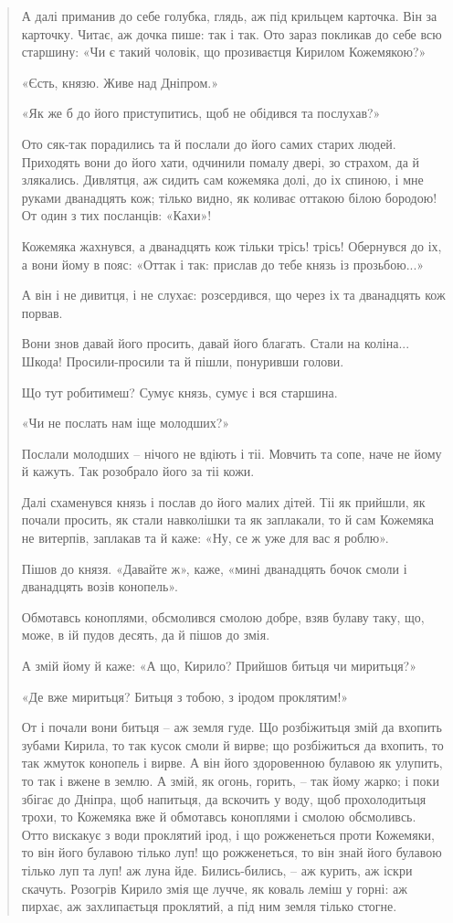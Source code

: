 \begin{quotation}
А далі приманив до себе голубка, глядь, аж під крильцем карточка. Він за карточку. Читає, аж дочка пише: так і так. Ото зараз покликав до себе всю старшину: «Чи є такий чоловік, що прозиваєтця Кирилом Кожемякою?»

«Єсть, князю. Живе над Дніпром.»

«Як же б до його приступитись, щоб не обідився та послухав?»

Ото сяк-так порадились та й послали до його самих старих людей. Приходять вони до його хати, одчинили помалу двері, зо страхом, да й злякались. Дивлятця, аж сидить сам кожемяка долі, до іх спиною, і мне руками дванадцять кож; тілько видно, як коливає оттакою білою бородою! От один з тих посланців: «Кахи»!

Кожемяка жахнувся, а дванадцять кож тільки трісь! трісь! Обернувся до іх, а вони йому в пояс: «Оттак і так: прислав до тебе князь із прозьбою...»

А він і не дивитця, і не слухає: розсердився, що через іх та дванадцять кож порвав.

Вони знов давай його просить, давай його благать. Стали на коліна... Шкода! Просили-просили та й пішли, понуривши голови.

Що тут робитимеш? Сумує князь, сумує і вся старшина.

«Чи не послать нам іще молодших?»

Послали молодших – нічого не вдіють і тіі. Мовчить та сопе, наче не йому й кажуть. Так розобрало його за тіі кожи.

Далі схаменувся князь і послав до його малих дітей. Тіі як прийшли, як почали просить, як стали навколішки та як заплакали, то й сам Кожемяка не витерпів, заплакав та й каже: «Ну, се ж уже для вас я роблю». 

Пішов до князя. «Давайте ж»,  каже,  «мині дванадцять бочок смоли і дванадцять возів конопель».

Обмотавсь коноплями, обсмолився смолою добре, взяв булаву таку, що, може, в ій пудов десять, да й пішов до змія.

А змій йому й каже: «А що, Кирило? Прийшов битьця чи миритьця?»

«Де вже миритьця? Битьця з тобою, з іродом проклятим!»

От і почали вони битьця – аж земля гуде. Що розбіжитьця змій да вхопить зубами Кирила, то так кусок смоли й вирве; що розбіжиться да вхопить, то так жмуток конопель і вирве. А він його здоровенною булавою як улупить, то так і вжене в землю. А змій, як огонь, горить, –  так йому жарко; і поки збігає до Дніпра, щоб напитьця, да вскочить у воду, щоб прохолодитьця трохи, то Кожемяка вже й обмотавсь коноплями і смолою обсмоливсь. Отто вискакує з води проклятий ірод, і що рожженеться проти Кожемяки, то він його булавою тілько луп! що рожженеться, то він знай його булавою тілько луп та луп! аж луна йде. Бились-бились, – аж курить, аж іскри скачуть. Розогрів Кирило змія ще лучче, як коваль леміш у горні: аж пирхає, аж захлипаєтьця проклятий, а під ним земля тілько стогне.


\end{quotation}
